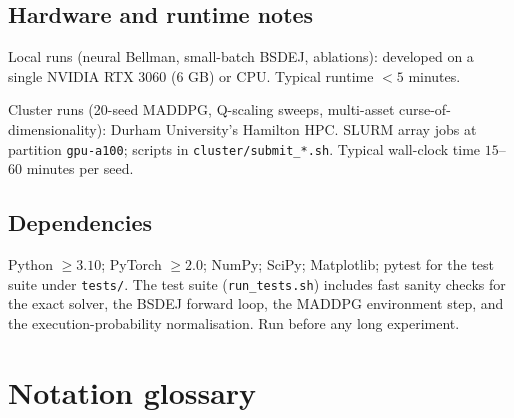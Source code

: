 \section{Hardware and runtime notes}

Local runs (neural Bellman, small-batch BSDEJ, ablations): developed on a single NVIDIA RTX 3060 (6 GB) or CPU. Typical runtime $<5$ minutes.

Cluster runs (20-seed MADDPG, Q-scaling sweeps, multi-asset curse-of-dimensionality): Durham University's Hamilton HPC. SLURM array jobs at partition \texttt{gpu-a100}; scripts in \texttt{cluster/submit\_*.sh}. Typical wall-clock time $15$--$60$ minutes per seed.

\section{Dependencies}

Python $\geq 3.10$; PyTorch $\geq 2.0$; NumPy; SciPy; Matplotlib; pytest for the test suite under \texttt{tests/}. The test suite (\texttt{run\_tests.sh}) includes fast sanity checks for the exact solver, the BSDEJ forward loop, the MADDPG environment step, and the execution-probability normalisation. Run before any long experiment.

\chapter{Notation glossary}
\label{app:notation}


